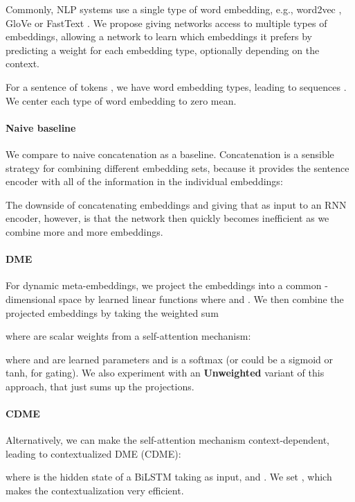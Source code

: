 \documentclass[11pt,a4paper]{article}
\begin{document}
Commonly, NLP systems use a single type of word embedding, e.g., word2vec \cite{Mikolov:2013nips}, GloVe \cite{Pennington:2014emnlp} or FastText \cite{Bojanowski:2016arxiv}. We propose giving networks access to multiple types of embeddings, allowing a network to learn which embeddings it prefers by predicting a weight for each embedding type, optionally depending on the context.

For a sentence of  tokens , we have  word embedding types, leading to sequences . We center each type of word embedding to zero mean.

\paragraph{Naive baseline}

We compare to naive concatenation as a baseline. Concatenation is a sensible strategy for combining different embedding sets, because it provides the sentence encoder with all of the information in the individual embeddings:



\noindent The downside of concatenating embeddings and giving that as input to an RNN encoder, however, is that the network then quickly becomes inefficient as we combine more and more embeddings.

\paragraph{DME}

For dynamic meta-embeddings, we project the embeddings into a common -dimensional space by learned linear functions  where  and . We then combine the projected embeddings by taking the weighted sum 

where  are scalar weights from a self-attention mechanism:

where  and  are learned parameters and  is a softmax (or could be a sigmoid or tanh, for gating). We also experiment with an \textbf{Unweighted} variant of this approach, that just sums up the projections.

\paragraph{CDME}

Alternatively, we can make the self-attention mechanism context-dependent, leading to contextualized DME (CDME):

where  is the  hidden state of a BiLSTM taking  as input,  and . We set , which makes the contextualization very efficient.
\end{document}
